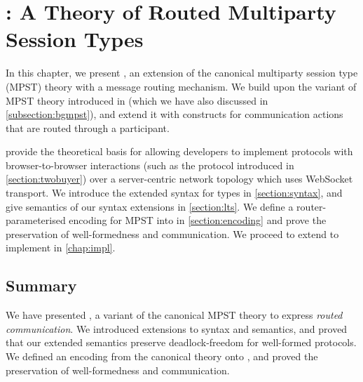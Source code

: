 \chapter{\newtheory: A Theory of
Routed Multiparty Session Types}
\label{chap:theory}

In this chapter, we present
\newtheory, an extension of the
canonical multiparty session type (MPST)
theory with a message routing mechanism.
We build upon the variant of MPST theory introduced
in \cite{LessIsMore}
(which we have also discussed in \cref{subsection:bgmpst}), 
and extend it
with constructs for communication actions
that are routed through a participant.

\newtheory provide the theoretical basis
for allowing developers to implement
protocols with browser-to-browser interactions
(such as the  protocol
introduced in \cref{section:twobuyer})
over a server-centric network topology
which uses WebSocket transport.
We introduce the extended syntax for types in 
\cref{section:syntax}, and give semantics of our
syntax extensions in \cref{section:lts}.
We define a router-parameterised encoding
for MPST into \newtheory in \cref{section:encoding}
and prove the preservation of well-formedness
and communication.
We proceed to extend \codegen to implement \newtheory
in \cref{chap:impl}.









\section{Summary}
We have presented \newtheory, a variant of
the canonical MPST theory to express \textit{routed communication}.
We introduced extensions to syntax and semantics, and proved
that our extended semantics preserve deadlock-freedom
for well-formed protocols. We defined an encoding from the
canonical theory onto \newtheory, and proved the preservation
of well-formedness and communication.